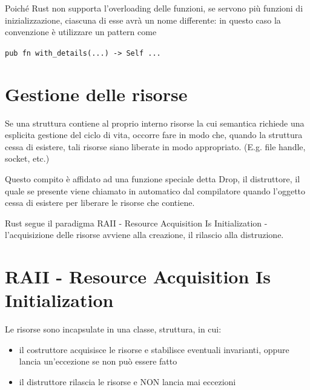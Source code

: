 Poiché Rust non supporta l'overloading delle funzioni, se servono più funzioni di inizializzazione,
ciascuna di esse avrà un nome differente: in questo caso la convenzione è utilizzare un pattern come

\begin{center}
  \centering
  \texttt{pub fn with_details(...) -> Self {...}}
\end{center}


\section{Gestione delle risorse}



Se una struttura contiene al proprio interno risorse la cui semantica richiede una
esplicita gestione del ciclo di vita, occorre fare in modo che, quando la struttura
cessa di esistere, tali risorse siano liberate in modo appropriato. (E.g. file handle, socket, etc.)


Questo compito è affidato ad una funzione speciale detta Drop, il distruttore, il quale se presente viene
chiamato in automatico dal compilatore quando l'oggetto cessa di esistere per liberare le risorse che contiene.





Rust segue il paradigma RAII - Resource Acquisition Is Initialization - l'acquisizione
delle risorse avviene alla creazione, il rilascio alla distruzione.

\section{RAII - Resource Acquisition Is Initialization}

Le risorse sono incapsulate in una classe, struttura, in cui:

\begin{itemize}
  \item il costruttore acquisisce le risorse e stabilisce eventuali invarianti, oppure
        lancia un'eccezione se non può essere fatto
  \item il distruttore rilascia le risorse e NON lancia mai eccezioni
\end{itemize}

